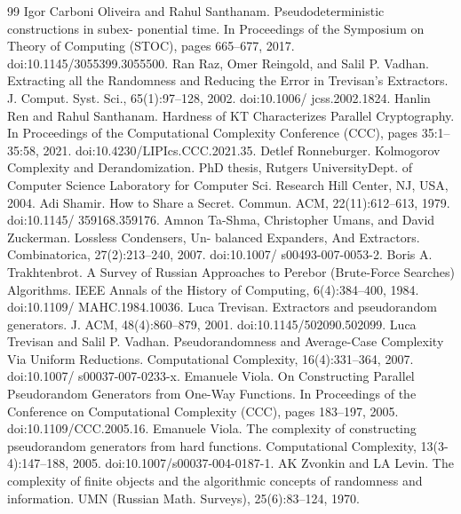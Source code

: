 \documentclass[10pt,a4paper]{article}
\begin{document}
\begin{thebibliography}{99}
 Igor Carboni Oliveira and Rahul Santhanam. Pseudodeterministic constructions in subex- ponential time. In Proceedings of the Symposium on Theory of Computing (STOC), pages 665–677, 2017. doi:10.1145/3055399.3055500.
 Ran Raz, Omer Reingold, and Salil P. Vadhan. Extracting all the Randomness and Reducing the Error in Trevisan’s Extractors. J. Comput. Syst. Sci., 65(1):97–128, 2002. doi:10.1006/ jcss.2002.1824.
 Hanlin Ren and Rahul Santhanam. Hardness of KT Characterizes Parallel Cryptography. In Proceedings of the Computational Complexity Conference (CCC), pages 35:1–35:58, 2021. doi:10.4230/LIPIcs.CCC.2021.35.
 Detlef Ronneburger. Kolmogorov Complexity and Derandomization. PhD thesis, Rutgers UniversityDept. of Computer Science Laboratory for Computer Sci. Research Hill Center, NJ, USA, 2004.
 Adi Shamir. How to Share a Secret. Commun. ACM, 22(11):612–613, 1979. doi:10.1145/ 359168.359176.
 Amnon Ta-Shma, Christopher Umans, and David Zuckerman. Lossless Condensers, Un- balanced Expanders, And Extractors. Combinatorica, 27(2):213–240, 2007. doi:10.1007/ s00493-007-0053-2.
 Boris A. Trakhtenbrot. A Survey of Russian Approaches to Perebor (Brute-Force Searches) Algorithms. IEEE Annals of the History of Computing, 6(4):384–400, 1984. doi:10.1109/ MAHC.1984.10036.
 Luca Trevisan. Extractors and pseudorandom generators. J. ACM, 48(4):860–879, 2001. doi:10.1145/502090.502099.
 Luca Trevisan and Salil P. Vadhan. Pseudorandomness and Average-Case Complexity Via Uniform Reductions. Computational Complexity, 16(4):331–364, 2007. doi:10.1007/ s00037-007-0233-x.
 Emanuele Viola. On Constructing Parallel Pseudorandom Generators from One-Way Functions. In Proceedings of the Conference on Computational Complexity (CCC), pages 183–197, 2005. doi:10.1109/CCC.2005.16.
 Emanuele Viola. The complexity of constructing pseudorandom generators from hard functions. Computational Complexity, 13(3-4):147–188, 2005. doi:10.1007/s00037-004-0187-1.
 AK Zvonkin and LA Levin. The complexity of finite objects and the algorithmic concepts of randomness and information. UMN (Russian Math. Surveys), 25(6):83–124, 1970.
\end{thebibliography}
\end{document}
